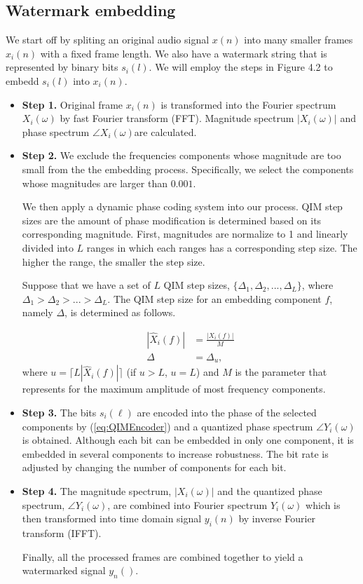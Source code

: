 \subsection{Watermark embedding}
We start off by spliting an original audio signal \(x(n)\) into many smaller frames \(x_i(n)\) with a fixed frame length. We also have a watermark string that is represented by binary bits \(s_i(l)\). We will employ the steps in Figure 4.2 to embedd \(s_i(l)\) into \(x_i(n)\).
\begin{itemize}
\item{\textbf{Step 1.}} Original frame \(x_i(n)\) is transformed into the Fourier spectrum \(X_i(\omega)\) by fast Fourier transform (FFT). Magnitude spectrum \(|X_i(\omega)|\) and phase spectrum \(\angle X_i(\omega)\)are calculated.
\item{\textbf{Step 2.}} We exclude the frequencies components whose magnitude are too small from the the embedding process. Specifically, we select the components whose magnitudes are larger than \(0.001\).

We then apply a dynamic phase coding system into our process. QIM step sizes are the amount of phase modification is determined based on its corresponding magnitude. First, magnitudes are normalize to 1 and linearly divided into \(L\) ranges in which each ranges has a corresponding step size. The higher the range, the smaller the step size.

Suppose that we have a set of \(L\) QIM step sizes, $\{\Delta_1, \Delta_2, ..., \Delta_L\}$, where $\Delta_1 > \Delta_2 > ... > \Delta_L$. The QIM step size for an embedding component $f$, namely $\Delta$, is determined as follows.

\begin{align}
\nonumber |\hat{X}_i(f)| &= \frac{|X_i(f)|}{M} \\
\Delta &= \Delta_u,
\end{align}
 where $u = \lceil L |\hat{X}_i(f)| \rceil$ (if $u>L$, $u=L$) and $M$ is the parameter that represents for the maximum amplitude of most frequency components.

\item{\textbf{Step 3.}}  The bits $s_i(\ell)$ are encoded into the phase of the selected components by (\ref{eq:QIMEncoder}) and a quantized phase spectrum $\angle Y_i(\omega)$ is obtained. Although each bit can be embedded in only one component, it is embedded in several components to increase robustness. The bit rate is adjusted by changing the number of components for each bit.

\item{\textbf{Step 4.}} The magnitude spectrum, $|X_i(\omega)|$ and the quantized phase spectrum, $\angle Y_i(\omega)$, are combined into Fourier spectrum $Y_i(\omega)$ which is then transformed into time domain signal \(y_i(n)\) by inverse Fourier transform (IFFT).

Finally, all the processed frames are combined together to yield a watermarked signal \(y_n()\).

\end{itemize}


